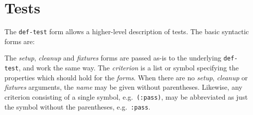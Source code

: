 \section{Tests}
 The
\texttt{def-test}
form allows a higher-level description of tests.  The basic syntactic
forms are:

The \textit{setup}, \textit{cleanup} and \textit{fixtures} forms are
passed as-is to the underlying \texttt{def-test}, and work the same
way.  The \textit{criterion} is a list or symbol specifying the
properties which should hold for the \textit{forms}.  When there are
no \textit{setup}, \textit{cleanup} or \textit{fixtures} arguments,
the \textit{name} may be given without parentheses.  Likewise, any
criterion consisting of a single symbol, e.g.\ \texttt{(:pass)}, may
be abbreviated as just the symbol without the parentheses, e.g.\
\texttt{:pass}.

\def\criteriaGroup#1#2{\subsection{#1} #2}
\def\secText#1{#1}
\def\endcriteriaGroup{}
\def\criteriaDoc#1#2#3#4#5#6#7#8{%
\subsubsection{The \texttt{#2} criterion} 
#4\index{#1@\texttt{#2}}
\\ Syntax: \texttt{#3}
#7{#8}#6}
\def\noEx#1{}
\def\singleEx#1{\\Example: \texttt{#1}}
\def\multiEx#1{#1}
\def\passExample#1{\\Passing example: \texttt{#1}}
\def\failExample#1{\\Failing example: \texttt{#1}}
\def\tabbingEx#1{\\Example: \begin{tabbing}#1\end{tabbing}}
\def\noExpl{}
\def\hasExpl#1{\par#1}


